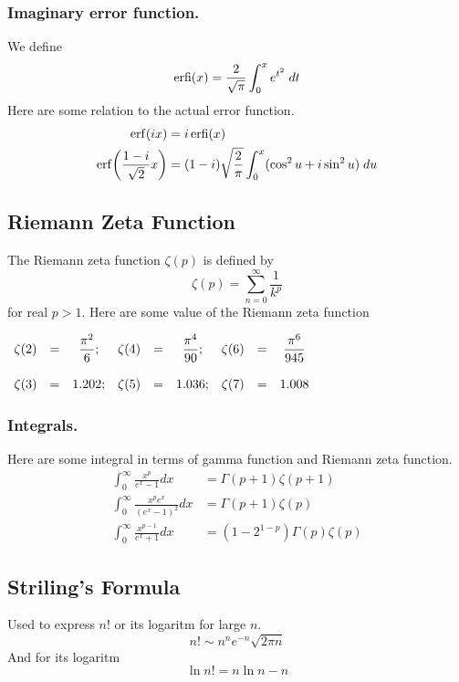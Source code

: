 \documentclass[../../main.tex]{subfiles}
\begin{document}
\subsubsection*{Imaginary error function.} We deﬁne
\begin{equation*}
    \operatorname{erfi}(x)=\frac{2}{\sqrt{\pi}}\int_{0}^{x}e^{t^2}\;dt
\end{equation*}
Here are some relation to the actual error function.
\begin{align*}
    \operatorname{erf}(ix)&=i\operatorname{erfi}(x)\\
    \operatorname{erf}\biggl(\frac{1-i }{\sqrt{2}}x\biggr)&=(1-i   )\sqrt{\frac{2}{\pi}}\int_{0}^{x}(\cos^2u+i\sin^2u)\;du
\end{align*}

\subsection*{Riemann Zeta Function}
The Riemann zeta function \(\zeta(p)\) is defined by
\begin{equation*}
    \zeta(p)=\sum_{n=0}^{\infty}\frac{1}{k^p}
\end{equation*}
for real $p>1$. Here are some value of the Riemann zeta function
\begin{center}
    $\begin{array}{c c c c c c c c c}
        \zeta(2)&=&\dfrac{\pi^2}{6};& \zeta(4)&=&\dfrac{\pi^4}{90}; & \zeta(6)&= &\dfrac{\pi^6}{945}\\\\
        \zeta(3)&=&1.202;&  \zeta(5)&=&1.036;& \zeta(7)&=&1.008 \\
    \end{array}$
\end{center}

\subsubsection*{Integrals.} Here are some integral in terms of gamma function and Riemann zeta function.
\begin{align*}
    \int_{0}^{\infty}\frac{x^p}{e^x-1}dx&=\Gamma(p+1)\zeta(p+1)\\
    \int_{0}^{\infty}\frac{x^pe^x}{\left(e^x-1\right)^2}dx&= \Gamma(p+1)\zeta(p)\\
    \int_{0}^{\infty}\frac{x^{p-1}}{e^x+1}dx& = \left(1-2^{1-p}\right)\Gamma(p) \zeta(p)
\end{align*}

\subsection*{Striling's Formula}
Used to express $n!$ or its logaritm for large $n$.
\begin{equation*}
    n!\sim n^ne^{-n}\sqrt{2\pi n}
\end{equation*}
And for its logaritm
\begin{equation*}
    \ln n!=n\ln n- n
\end{equation*}
\end{document}
